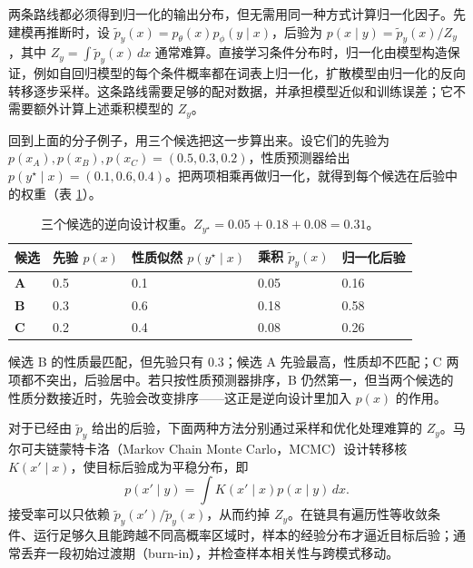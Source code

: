 两条路线都必须得到归一化的输出分布，但无需用同一种方式计算归一化因子。先建模再推断时，设 \(\widetilde p_y(x)=p_\theta(x)p_\phi(y\mid x)\)，后验为 \(p(x\mid y)=\widetilde p_y(x)/Z_y\)，其中 \(Z_y=\int\widetilde p_y(x)\,dx\) 通常难算。直接学习条件分布时，归一化由模型构造保证，例如自回归模型的每个条件概率都在词表上归一化，扩散模型由归一化的反向转移逐步采样。这条路线需要足够的配对数据，并承担模型近似和训练误差；它不需要额外计算上述乘积模型的 \(Z_y\)。

回到上面的分子例子，用三个候选把这一步算出来。设它们的先验为 \(p(x_A),p(x_B),p(x_C)=(0.5,0.3,0.2)\)，性质预测器给出 \(p(y^\star\mid x)=(0.1,0.6,0.4)\)。把两项相乘再做归一化，就得到每个候选在后验中的权重（表 \ref{tab:inverse-design-weights}）。

\begin{table}[H]
\centering\small
\begin{tabularx}{\textwidth}{>{\bfseries}p{16mm} X X X X}
\toprule
候选 & 先验 \(p(x)\) & 性质似然 \(p(y^\star\mid x)\) & 乘积 \(\widetilde p_y(x)\) & 归一化后验\\
\midrule
A & 0.5 & 0.1 & 0.05 & 0.16\\
B & 0.3 & 0.6 & 0.18 & 0.58\\
C & 0.2 & 0.4 & 0.08 & 0.26\\
\bottomrule
\end{tabularx}
\caption{三个候选的逆向设计权重。\(Z_{y^\star}=0.05+0.18+0.08=0.31\)。}
\label{tab:inverse-design-weights}
\end{table}

候选 B 的性质最匹配，但先验只有 0.3；候选 A 先验最高，性质却不匹配；C 两项都不突出，后验居中。若只按性质预测器排序，B 仍然第一，但当两个候选的性质分数接近时，先验会改变排序——这正是逆向设计里加入 \(p(x)\) 的作用。

对于已经由 \(\widetilde p_y\) 给出的后验，下面两种方法分别通过采样和优化处理难算的 \(Z_y\)。马尔可夫链蒙特卡洛（Markov Chain Monte Carlo，MCMC）设计转移核 \(K(x'\mid x)\)，使目标后验成为平稳分布，即
\begin{equation}
 p(x'\mid y)=\int K(x'\mid x)p(x\mid y)\,dx.
\end{equation}
接受率可以只依赖 \(\widetilde p_y(x')/\widetilde p_y(x)\)，从而约掉 \(Z_y\)。在链具有遍历性等收敛条件、运行足够久且能跨越不同高概率区域时，样本的经验分布才逼近目标后验；通常丢弃一段初始过渡期（burn-in），并检查样本相关性与跨模式移动。

